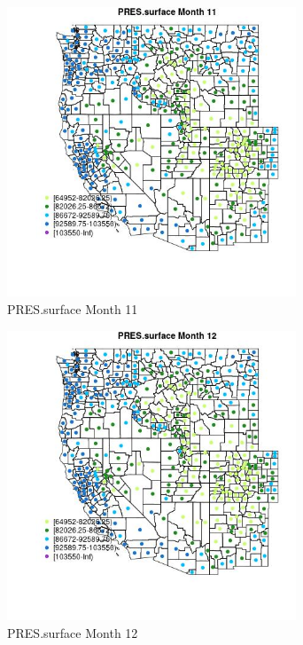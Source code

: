 \begin{figure} 
\centering  
\includegraphics[width=0.77\textwidth]{Code_Outputs/df_report_ML_predictors_CountyCentroid_Locations_Dates_2008-01-01to2018-12-31_MapObsMo11PRESsurface.jpg} 
\caption{\label{fig:df_report_ML_predictors_CountyCentroid_Locations_Dates_2008-01-01to2018-12-31MapObsMo11PRESsurface}PRES.surface Month 11} 
\end{figure} 
 

\begin{figure} 
\centering  
\includegraphics[width=0.77\textwidth]{Code_Outputs/df_report_ML_predictors_CountyCentroid_Locations_Dates_2008-01-01to2018-12-31_MapObsMo12PRESsurface.jpg} 
\caption{\label{fig:df_report_ML_predictors_CountyCentroid_Locations_Dates_2008-01-01to2018-12-31MapObsMo12PRESsurface}PRES.surface Month 12} 
\end{figure} 
 

